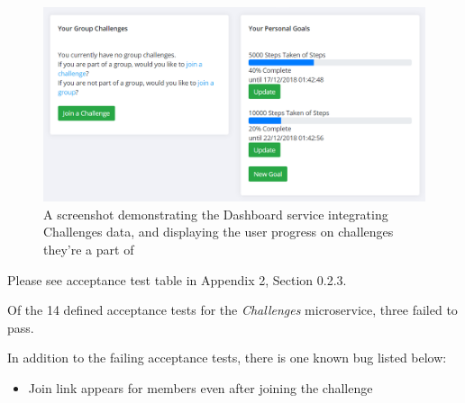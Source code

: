 \begin{figure}[H]
    \centering
    \includegraphics[width=\textwidth]{Images/service_challenges.png}
    \caption{A screenshot demonstrating the Dashboard service integrating Challenges data, and displaying the user progress on challenges they're a part of}
\end{figure}

Please see acceptance test table in Appendix 2, Section 0.2.3.

Of the 14 defined acceptance tests for the \textit{Challenges} microservice, three failed to pass. 

In addition to the failing acceptance tests, there is one known bug listed below:

\begin{itemize}
	\item Join link appears for members even after joining the challenge
\end{itemize}